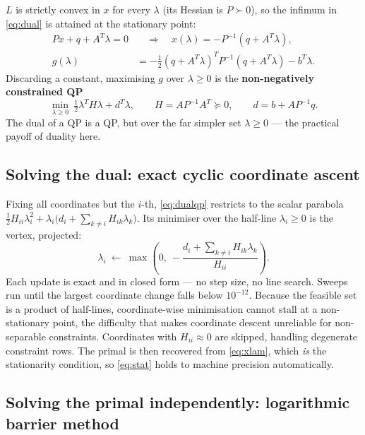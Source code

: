\documentclass[11pt,a4paper]{article}
\theoremstyle{definition}
\begin{document}
$L$ is strictly convex in $x$ for every $\lambda$ (its Hessian is $P\succ 0$), so the infimum in
\eqref{eq:dual} is attained at the stationary point:
\begin{align}
Px+q+A^{T}\lambda=0 &\quad\Longrightarrow\quad x(\lambda)=-P^{-1}(q+A^{T}\lambda),
\label{eq:xlam}\\[4pt]
g(\lambda)&=-\tfrac{1}{2}(q+A^{T}\lambda)^{T}P^{-1}(q+A^{T}\lambda)-b^{T}\lambda.
\label{eq:gqp}
\end{align}
Discarding a constant, maximising $g$ over $\lambda\ge 0$ is the \textbf{non-negatively
constrained QP}
\begin{equation}\label{eq:dualqp}
\min_{\lambda\ge 0}\ \tfrac{1}{2}\lambda^{T}H\lambda+d^{T}\lambda,\qquad
H=AP^{-1}A^{T}\succeq 0,\qquad d=b+AP^{-1}q.
\end{equation}
The dual of a QP is a QP, but over the far simpler set $\lambda\ge 0$ --- the practical payoff of
duality here.

\subsection{Solving the dual: exact cyclic coordinate ascent}

Fixing all coordinates but the $i$-th, \eqref{eq:dualqp} restricts to the scalar parabola
$\tfrac{1}{2}H_{ii}\lambda_{i}^{2}+\lambda_{i}\bigl(d_{i}+\sum_{k\ne i}H_{ik}\lambda_{k}\bigr)$.
Its minimiser over the half-line $\lambda_{i}\ge 0$ is the vertex, projected:
\begin{equation}\label{eq:cd}
\lambda_{i}\ \leftarrow\ \max\!\left(0,\
-\frac{d_{i}+\sum_{k\ne i}H_{ik}\lambda_{k}}{H_{ii}}\right).
\end{equation}
Each update is exact and in closed form --- no step size, no line search. Sweeps run until the
largest coordinate change falls below $10^{-12}$. Because the feasible set is a product of
half-lines, coordinate-wise minimisation cannot stall at a non-stationary point, the difficulty
that makes coordinate descent unreliable for non-separable constraints. Coordinates with
$H_{ii}\approx 0$ are skipped, handling degenerate constraint rows. The primal is then recovered
from \eqref{eq:xlam}, which \emph{is} the stationarity condition, so \eqref{eq:stat} holds to
machine precision automatically.

\subsection{Solving the primal independently: logarithmic barrier method}
\end{document}
